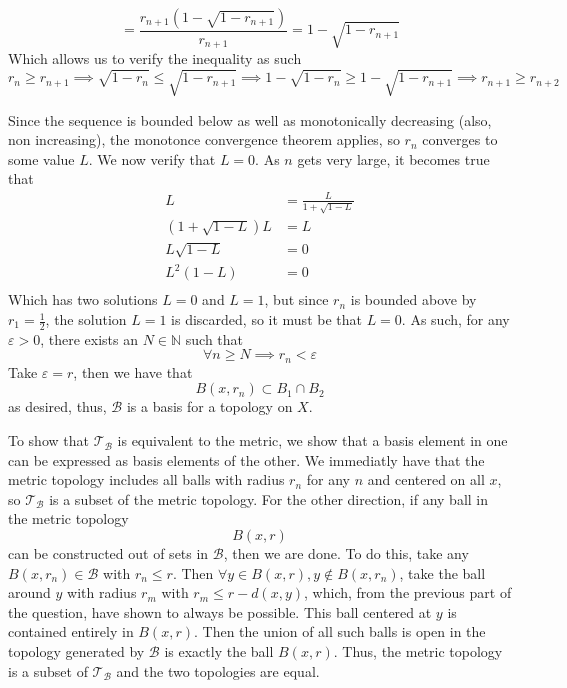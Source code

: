 \documentclass{article} %
\begin{document}
\begin{enumerate}
\begin{enumerate}
\[        = \frac{r_{n+1}\left(1 - \sqrt{1 - r_{n+1}}\right)}{r_{n+1}}
        = 1 - \sqrt{1 - r_{n+1}}
      \]
      Which allows us to verify the inequality as such
      \[
        r_{n} \ge r_{n+1} \implies \sqrt{1 - r_n} \le \sqrt{1 -
        r_{n+1}} \implies 1 - \sqrt{1-r_n} \ge 1 - \sqrt{1-r_{n+1}}
        \implies r_{n+1} \ge r_{n+2}
      \]
  \end{enumerate}
  Since the sequence is bounded below as well as monotonically
  decreasing (also, non increasing), the monotonce convergence
  theorem applies, so $r_n$ converges to some value $L$. We now
  verify that $L = 0$. As $n$ gets very large, it becomes true that
  \begin{align*}
    L &= \frac{L}{1 + \sqrt{1 - L}} \\
    (1 + \sqrt{1 - L})L &= L \\
    L\sqrt{1-L} &= 0 \\
    L^2(1-L) &= 0 \\
  \end{align*}
  Which has two solutions $L = 0$ and $L = 1$, but since $r_n$ is
  bounded above by $r_1 = \frac{1}{2}$, the solution $L = 1$ is
  discarded, so it must be that $L = 0$. As such, for any $\varepsilon >
  0$, there exists an $N \in \mathbb{N}$ such that
  \[
    \forall n \ge N \implies r_n < \varepsilon
  \]
  Take $\varepsilon = r$, then we have that
  \[
    B(x, r_n) \subset B_1 \cap B_2
  \]
  as desired, thus, $\mathcal{B}$ is a basis for a topology on $X$.
\end{enumerate}
To show that $\mathcal{T}_\mathcal{B}$ is equivalent to the metric,
we show that a basis element in one can be expressed as basis
elements of the other. We immediatly have that the metric topology
includes all balls with radius $r_n$ for any $n$ and centered on all
$x$, so $\mathcal{T}_\mathcal{B}$ is a subset of the metric topology.
For the other direction, if any ball in the metric topology
\[
B(x,r)
\]
can be constructed out of sets in $\mathcal{B}$, then we are done. To
do this, take any $B(x, r_n) \in \mathcal{B}$ with $r_n \le r$. Then
$\forall y \in B(x,r), y \notin B(x,r_n)$, take the ball around $y$
with radius $r_m$ with $r_m \le r - d(x,y)$, which, from the previous
part of the question, have shown to always be possible. This ball
centered at $y$ is contained entirely in $B(x,r)$. Then the
union of all such balls is open in the topology generated by
$\mathcal{B}$ is exactly the ball $B(x, r)$. Thus, the metric
topology is a subset of $\mathcal{T}_\mathcal{B}$ and the two
topologies are equal.
\end{document}
